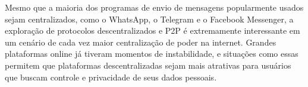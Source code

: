 Mesmo que a maioria dos programas de envio de mensagens popularmente usados sejam centralizados, como o WhatsApp, o Telegram e o Facebook Messenger, a exploração de protocolos descentralizados e P2P é extremamente interessante em um cenário de cada vez maior centralização de poder na internet. Grandes plataformas online já tiveram momentos de instabilidade, e situações como essas permitem que plataformas descentralizadas sejam mais atrativas para usuários que buscam controle e privacidade de seus dados pessoais.